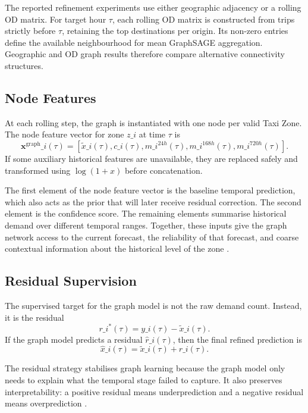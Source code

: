 \documentclass[12pt,a4paper]{report}
\begin{document}
The reported refinement experiments use either geographic adjacency or a rolling OD matrix. For target hour \(\tau\), each rolling OD matrix is constructed from trips strictly before \(\tau\), retaining the top destinations per origin. Its non-zero entries define the available neighbourhood for mean GraphSAGE aggregation. Geographic and OD graph results therefore compare alternative connectivity structures.

\subsection{Node Features}

At each rolling step, the graph is instantiated with one node per valid Taxi Zone. The node feature vector for zone \(z\_i\) at time \(\tau\) is
\[
\mathbf{x}^{\text{graph}}\_i(\tau)
=
[
\tilde{x}\_i(\tau),
c\_i(\tau),
m\_i^{24h}(\tau),
m\_i^{168h}(\tau),
m\_i^{720h}(\tau)
].
\]
If some auxiliary historical features are unavailable, they are replaced safely and transformed using \(\log(1+x)\) before concatenation.

The first element of the node feature vector is the baseline temporal prediction, which also acts as the prior that will later receive residual correction. The second element is the confidence score. The remaining elements summarise historical demand over different temporal ranges. Together, these inputs give the graph network access to the current forecast, the reliability of that forecast, and coarse contextual information about the historical level of the zone \cite{lyu2021bigdata,lim2021survey}.

\subsection{Residual Supervision}

The supervised target for the graph model is not the raw demand count. Instead, it is the residual
\[
r\_i^*(\tau) = y\_i(\tau) - \tilde{x}\_i(\tau).
\]
If the graph model predicts a residual \(\hat{r}\_i(\tau)\), then the final refined prediction is
\[
\hat{x}\_i(\tau) = \tilde{x}\_i(\tau) + \hat{r}\_i(\tau).
\]

The residual strategy stabilises graph learning because the graph model only needs to explain what the temporal stage failed to capture. It also preserves interpretability: a positive residual means underprediction and a negative residual means overprediction \cite{shao2022d2stgnn}.
\end{document}

